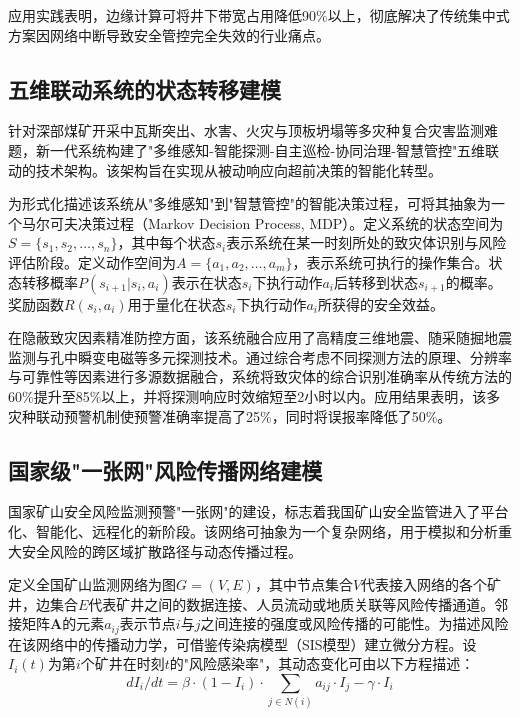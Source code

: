 \documentclass[twocolumn,a4paper]{ctexart}
\numberwithin{equation}{section}
\begin{document}
应用实践表明，边缘计算可将井下带宽占用降低90\%以上，彻底解决了传统集中式方案因网络中断导致安全管控完全失效的行业痛点。

\subsection{五维联动系统的状态转移建模}

针对深部煤矿开采中瓦斯突出、水害、火灾与顶板坍塌等多灾种复合灾害监测难题，新一代系统构建了"多维感知-智能探测-自主巡检-协同治理-智慧管控"五维联动的技术架构。该架构旨在实现从被动响应向超前决策的智能化转型。

为形式化描述该系统从"多维感知"到"智慧管控"的智能决策过程，可将其抽象为一个马尔可夫决策过程（Markov Decision Process, MDP）。定义系统的状态空间为$S=\{s_1,s_2,\ldots,s_n\}$，其中每个状态$s_i$表示系统在某一时刻所处的致灾体识别与风险评估阶段。定义动作空间为$A=\{a_1,a_2,\ldots,a_m\}$，表示系统可执行的操作集合。状态转移概率$P(s_{i+1}|s_i,a_i)$表示在状态$s_i$下执行动作$a_i$后转移到状态$s_{i+1}$的概率。奖励函数$R(s_i,a_i)$用于量化在状态$s_i$下执行动作$a_i$所获得的安全效益。

在隐蔽致灾因素精准防控方面，该系统融合应用了高精度三维地震、随采随掘地震监测与孔中瞬变电磁等多元探测技术。通过综合考虑不同探测方法的原理、分辨率与可靠性等因素进行多源数据融合，系统将致灾体的综合识别准确率从传统方法的60\%提升至85\%以上，并将探测响应时效缩短至2小时以内。应用结果表明，该多灾种联动预警机制使预警准确率提高了25\%，同时将误报率降低了50\%。

\subsection{国家级"一张网"风险传播网络建模}

国家矿山安全风险监测预警"一张网"的建设，标志着我国矿山安全监管进入了平台化、智能化、远程化的新阶段。该网络可抽象为一个复杂网络，用于模拟和分析重大安全风险的跨区域扩散路径与动态传播过程。

定义全国矿山监测网络为图$G=(V,E)$，其中节点集合$V$代表接入网络的各个矿井，边集合$E$代表矿井之间的数据连接、人员流动或地质关联等风险传播通道。邻接矩阵$\bm{A}$的元素$a_{ij}$表示节点$i$与$j$之间连接的强度或风险传播的可能性。为描述风险在该网络中的传播动力学，可借鉴传染病模型（SIS模型）建立微分方程。设$I_i(t)$为第$i$个矿井在时刻$t$的"风险感染率"，其动态变化可由以下方程描述：
\begin{equation}
dI_i/dt = \beta \cdot (1-I_i) \cdot \sum_{j \in N(i)} a_{ij} \cdot I_j - \gamma \cdot I_i
\end{equation}
\end{document}
